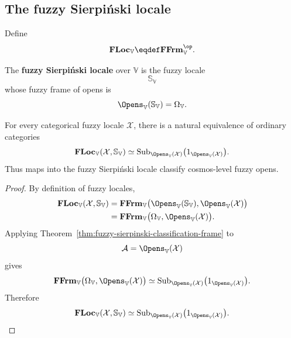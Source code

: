\subsection{The fuzzy Sierpiński locale}
\label{subsec:fuzzy-sierpinski-locale}

Define
\[
    \mathbf{FLoc}_{\mathbb V}
    \eqdef
    \mathbf{FFrm}_{\mathbb V}^{\op}.
\]

\begin{definition}
\label{def:fuzzy-sierpinski-locale}
The \textbf{fuzzy Sierpiński locale} over \(\mathbb V\) is the fuzzy locale
\[
    \mathbb S_{\mathbb V}
\]
whose fuzzy frame of opens is
\[
    \Opens_{\mathbb V}(\mathbb S_{\mathbb V})
    =
    \Omega_{\mathbb V}.
\]
\end{definition}

\begin{theorem}
\label{thm:fuzzy-sierpinski-classification-localic}
For every categorical fuzzy locale \(\mathcal X\), there is a natural equivalence
of ordinary categories
\[
    \mathbf{FLoc}_{\mathbb V}(\mathcal X,\mathbb S_{\mathbb V})
    \simeq
    \operatorname{Sub}_{\Opens_{\mathbb V}(\mathcal X)}
    \bigl(1_{\Opens_{\mathbb V}(\mathcal X)}\bigr).
\]
Thus maps into the fuzzy Sierpiński locale classify cosmos-level fuzzy opens.
\end{theorem}

\begin{proof}
By definition of fuzzy locales,
\[
\begin{aligned}
    \mathbf{FLoc}_{\mathbb V}(\mathcal X,\mathbb S_{\mathbb V})
    &=
    \mathbf{FFrm}_{\mathbb V}
    \bigl(
        \Opens_{\mathbb V}(\mathbb S_{\mathbb V}),
        \Opens_{\mathbb V}(\mathcal X)
    \bigr)
    \\
    &=
    \mathbf{FFrm}_{\mathbb V}
    \bigl(
        \Omega_{\mathbb V},
        \Opens_{\mathbb V}(\mathcal X)
    \bigr).
\end{aligned}
\]
Applying Theorem~\ref{thm:fuzzy-sierpinski-classification-frame} to
\[
    \mathcal A=\Opens_{\mathbb V}(\mathcal X)
\]
gives
\[
    \mathbf{FFrm}_{\mathbb V}
    \bigl(
        \Omega_{\mathbb V},
        \Opens_{\mathbb V}(\mathcal X)
    \bigr)
    \simeq
    \operatorname{Sub}_{\Opens_{\mathbb V}(\mathcal X)}
    \bigl(1_{\Opens_{\mathbb V}(\mathcal X)}\bigr).
\]
Therefore
\[
    \mathbf{FLoc}_{\mathbb V}(\mathcal X,\mathbb S_{\mathbb V})
    \simeq
    \operatorname{Sub}_{\Opens_{\mathbb V}(\mathcal X)}
    \bigl(1_{\Opens_{\mathbb V}(\mathcal X)}\bigr).
\]
\end{proof}

